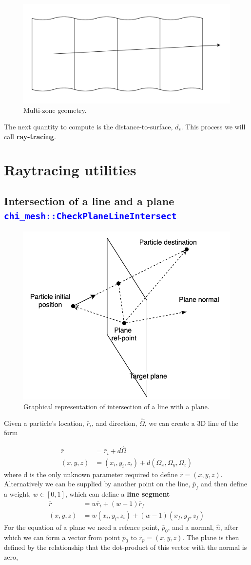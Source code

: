 \documentclass[11pt,letterpaper,titlepage]{article}
\newcommand{\xmltag}[1]{\textcolor{blue}{ \texttt{#1}} }
\newcommand{\beq}{\begin{equation*}
\begin{aligned}}
\newcommand{\eeq}{\end{aligned}
\end{equation*}}
\numberwithin{equation}{section}
\begin{document}
\begin{figure}[H]
\centering
\includegraphics[width=0.7\linewidth]{Figures/MultizoneHomo}
\caption{Multi-zone geometry.}
\label{fig:multizonehomo}
\end{figure}

The next quantity to compute is the distance-to-surface, $d_s$. This process we will call \textbf{ray-tracing}.

\newpage
{}
\section{Raytracing utilities}
\subsection{Intersection of a line and a plane \xmltag{chi\_mesh::CheckPlaneLineIntersect}}
\begin{figure}[H]
\centering
\includegraphics[width=0.4\linewidth]{Figures/MultizoneHomo1}
\caption{Graphical representation of intersection of a line with a plane.}
\label{fig:multizonehomo1}
\end{figure}

Given a particle's location, $\bar{r}_i$, and direction, $\hat{\Omega}$, we can create a 3D line of the form

\beq 
\bar{r} &= \bar{r}_i + d\hat{\Omega} \\
(x,y,z) &= (x_i,y_i,z_i) + d (\Omega_x,\Omega_y,\Omega_z)
\eeq 
\newline
where d is the only unknown parameter required to define $\bar{r} = (x,y,z)$. Alternatively we can be supplied by another point on the line, $\bar{p}_f$ and then define a weight, $w\in [0,1]$, which can define a \textbf{line segment}
\beq 
\bar{r} &= w\bar{r}_i + (w-1)\bar{r}_f\\
(x,y,z) &= w(x_i,y_i,z_i) + (w-1) (x_f,y_f,z_f)
\eeq 
\newline
For the equation of a plane we need a refence point, $\bar{p}_0$, and a normal, $\hat{n}$, after which we can form a vector from point $\bar{p}_0$ to $\bar{r}_p = (x,y,z)$. The plane is then defined by the relationship that the dot-product of this vector with the normal is zero, 
\end{document}
